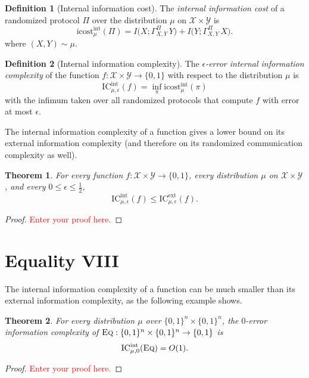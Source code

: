 \documentclass[11pt]{amsart}
\theoremstyle{plain}
\newtheorem{theorem}{Theorem}
\theoremstyle{definition}
\newtheorem{definition}{Definition}
\theoremstyle{plain}
\newcommand{\calX}{\mathcal{X}}
\newcommand{\calY}{\mathcal{Y}}
\newcommand{\Eq}{\textsc{Eq}}
\newcommand{\ICext}{\mathrm{IC}^{\mathrm{ext}}}
\newcommand{\ICint}{\mathrm{IC}^{\mathrm{int}}}
\newcommand{\icostint}{\mathrm{icost}^{\mathrm{int}}}
\newcommand{\replacethistext}[1]{\textcolor{red}{#1}}
\begin{document}
\begin{definition}[Internal information cost]
The \emph{internal information cost} of a randomized protocol $\Pi$ over the distribution $\mu$ on $\calX \times \calY$ is
\[
\icostint_\mu(\Pi) = I\big( X ; \Gamma_{X,Y}^\Pi \, Y\big) + I\big( Y ; \Gamma_{X,Y}^\Pi \, X\big).
\]
where $(X,Y) \sim \mu$.
\end{definition}

\begin{definition}[Internal information complexity]
The \emph{$\epsilon$-error internal information complexity} of the function $f : \calX \times \calY \to \{0,1\}$ with respect to the distribution $\mu$ is
\[
\ICint_{\mu,\epsilon}(f) = \inf_{\pi} \icostint_\mu(\pi)
\]
with the infimum taken over all randomized protocols that compute $f$ with error at most $\epsilon$.
\end{definition}

The internal information complexity of a function gives a lower bound on its external information complexity (and therefore on its randomized communication complexity as well).

\begin{theorem}
For every function $f : \calX \times \calY \to \{0,1\}$, every distribution $\mu$ on $\calX \times \calY$, and every $0 \le \epsilon \le \frac12$,
\[
\ICint_{\mu,\epsilon}(f) \le \ICext_{\mu,\epsilon}(f).
\]
\end{theorem}

\begin{proof}
\replacethistext{Enter your proof here.}
\end{proof}


\newpage 
\section{Equality VIII}

The internal information complexity of a function can be much smaller than its external information complexity, as the following example shows.

\begin{theorem}
For every distribution $\mu$ over $\{0,1\}^n \times \{0,1\}^n$, the $0$-error information complexity of $\Eq : \{0,1\}^n \times \{0,1\}^n \to \{0,1\}$ is 
\[
\ICint_{\mu,0}(\Eq) = O(1).
\]
\end{theorem}

\begin{proof}
\replacethistext{Enter your proof here.}
\end{proof}
\end{document}
